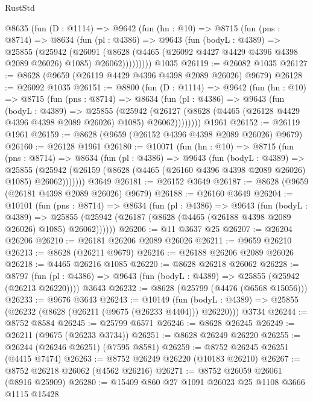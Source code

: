\begin{lexlean}{RustStd}
\begin{coremodule}
    @8635
      (fun (D : @1114) =>
      @9642
        (fun (hn : @10) =>
        @8715
          (fun (pns : @8714) =>
          @8634
            (fun (pl : @4386) =>
            @9643
              (fun (bodyL : @4389) =>
              @25855
                (@25942
                  (@26091
                    (@8628
                      (@4465 (@26092 @4427 @4429 @4396 @4398 @2089 @26026) @1085)
                      @26062)))))))))
    @1035
@26119 := @26082 @1035
@26127 := @8628 (@9659 (@26119 @4429 @4396 @4398 @2089 @26026) @9679)
@26128 := @26092 @1035
@26151 := @8800
    (fun (D : @1114) =>
    @9642
      (fun (hn : @10) =>
      @8715
        (fun (pns : @8714) =>
        @8634
          (fun (pl : @4386) =>
          @9643
            (fun (bodyL : @4389) =>
            @25855
              (@25942
                (@26127 (@8628 (@4465 (@26128 @4429 @4396 @4398 @2089 @26026) @1085) @26062))))))))
    @1961
@26152 := @26119 @1961
@26159 := @8628 (@9659 (@26152 @4396 @4398 @2089 @26026) @9679)
@26160 := @26128 @1961
@26180 := @10071
    (fun (hn : @10) =>
    @8715
      (fun (pns : @8714) =>
      @8634
        (fun (pl : @4386) =>
        @9643
          (fun (bodyL : @4389) =>
          @25855
            (@25942 (@26159 (@8628 (@4465 (@26160 @4396 @4398 @2089 @26026) @1085) @26062)))))))
    @3649
@26181 := @26152 @3649
@26187 := @8628 (@9659 (@26181 @4398 @2089 @26026) @9679)
@26188 := @26160 @3649
@26204 := @10101
    (fun (pns : @8714) =>
    @8634
      (fun (pl : @4386) =>
      @9643
        (fun (bodyL : @4389) =>
        @25855 (@25942 (@26187 (@8628 (@4465 (@26188 @4398 @2089 @26026) @1085) @26062))))))
@26206 := @11 @3637 @25
@26207 := @26204 @26206
@26210 := @26181 @26206 @2089 @26026
@26211 := @9659 @26210
@26213 := @8628 (@26211 @9679)
@26216 := @26188 @26206 @2089 @26026
@26218 := @4465 @26216 @1085
@26220 := @8628 @26218 @26062
@26228 := @8797
    (fun (pl : @4386) => @9643 (fun (bodyL : @4389) => @25855 (@25942 (@26213 @26220))))
    @3643
@26232 := @8628 (@25799 (@4476 (@6568 @15056)))
@26233 := @9676 @3643
@26243 := @10149
    (fun (bodyL : @4389) => @25855 (@26232 (@8628 (@26211 (@9675 (@26233 @4404))) @26220)))
    @3734
@26244 := @8752 @8584
@26245 := @25799 @6571
@26246 := @8628 @26245
@26249 := @26211 (@9675 (@26233 @3734))
@26251 := @8628 @26249 @26220
@26255 := @26244 (@26246 @26251) (@7595 @8581)
@26259 := @8752 @26245 @26251 (@4415 @7474)
@26263 := @8752 @26249 @26220 (@10183 @26210)
@26267 := @8752 @26218 @26062 (@4562 @26216)
@26271 := @8752 @26059 @26061 (@8916 @25909)
@26280 := @15409 @860 @27 @1091 @26023 @25 @1108 @3666 @1115 @15428

\end{coremodule}
\end{lexlean}
